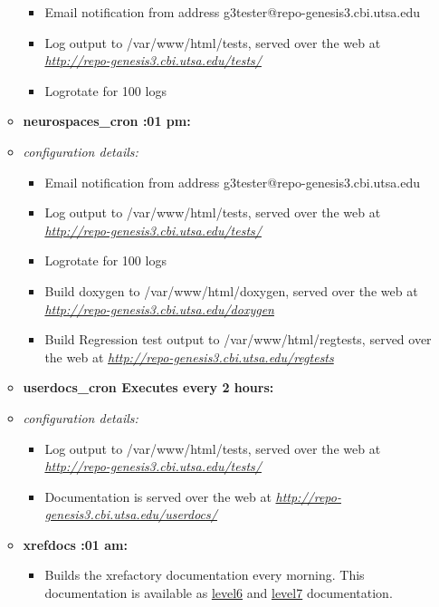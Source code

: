 \documentclass[12pt]{article}
\begin{document}
\begin{itemize}
\begin{itemize}
\begin{itemize}
	\item Email notification from address g3tester@repo-genesis3.cbi.utsa.edu
	\item Log output to /var/www/html/tests, served over the web at \href{http://repo-genesis3.cbi.utsa.edu/tests/}{\it http://repo-genesis3.cbi.utsa.edu/tests/}
	\item Logrotate for 100 logs
\end{itemize}

\item[] {\bf neurospaces\_cron :01 pm:}
	\item {\it configuration details:} 
\begin{itemize}

	\item Email notification from address g3tester@repo-genesis3.cbi.utsa.edu
	\item Log output to /var/www/html/tests, served over the web at \href{http://repo-genesis3.cbi.utsa.edu/tests/}{\it http://repo-genesis3.cbi.utsa.edu/tests/}
	\item Logrotate for 100 logs
	\item Build doxygen to /var/www/html/doxygen, served over the web at \href{http://repo-genesis3.cbi.utsa.edu/doxygen}{\it http://repo-genesis3.cbi.utsa.edu/doxygen}
	\item Build Regression test output to /var/www/html/regtests, served over the web at \href{http://repo-genesis3.cbi.utsa.edu/regtests}{\it http://repo-genesis3.cbi.utsa.edu/regtests}
\end{itemize}

\item[] {\bf userdocs\_cron \- Executes every 2 hours:}
	\item {\it configuration details:} 
\begin{itemize}

	\item Log output to /var/www/html/tests, served over the web at \href{http://repo-genesis3.cbi.utsa.edu/tests/}{\it http://repo-genesis3.cbi.utsa.edu/tests/}
	\item Documentation is served over the web at \href{http://repo-genesis3.cbi.utsa.edu/userdocs/}{\it http://repo-genesis3.cbi.utsa.edu/userdocs/}
\end{itemize}

\item[] {\bf xrefdocs :01 am:}
\begin{itemize}
	\item Builds the xrefactory documentation every morning.  This documentation is available as \href{../contents-level6/contents-level6.tex}{level6} and \href{../contents-level7/contents-level7.tex}{level7} documentation.
\end{itemize}
\end{itemize}

\end{itemize}
\end{document}
